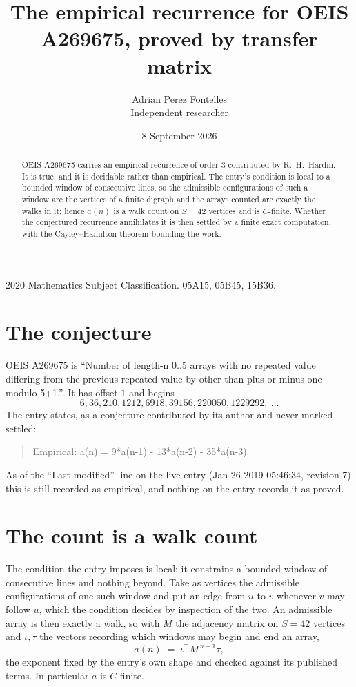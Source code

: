 \documentclass[11pt,a4paper]{article}
\title{The empirical recurrence for OEIS A269675, proved by transfer matrix}
\author{Adrian Perez Fontelles\\ \small Independent researcher}
\date{8 September 2026}
\theoremstyle{plain}
\theoremstyle{definition}
\begin{document}
\maketitle

\begin{abstract}
OEIS A269675 carries an empirical recurrence of order $3$ contributed by R.~H.~Hardin. It is
true, and it is decidable rather than empirical. The entry's condition is local to a bounded window of consecutive lines, so
the admissible configurations of such a window are the vertices of a finite digraph and the
arrays counted are exactly the walks in it; hence $a(n)$ is a walk count on $S=42$ vertices
and is $C$-finite. Whether the conjectured recurrence annihilates it is then settled by a
finite exact computation, with the Cayley--Hamilton theorem bounding the work.
\end{abstract}

\noindent\small 2020 Mathematics Subject Classification. 05A15, 05B45, 15B36.\normalsize

\section{The conjecture}

OEIS A269675 is ``Number of length-n 0..5 arrays with no repeated value differing from the previous repeated value by other than plus or minus one modulo 5+1.''. It has offset $1$ and begins
\[
6, 36, 210, 1212, 6918, 39156, 220050, 1229292,\ \dots
\]
The entry states, as a conjecture contributed by its author and never marked settled:
\begin{quote}
Empirical: a(n) = 9*a(n-1) - 13*a(n-2) - 35*a(n-3).
\end{quote}
As of the ``Last modified'' line on the live entry (Jan 26 2019 05:46:34, revision 7) this is still
recorded as empirical, and nothing on the entry records it as proved.

\section{The count is a walk count}

The condition the entry imposes is local: it constrains a bounded window of consecutive lines and nothing beyond. Take as
vertices the admissible configurations of one such window and put an edge from $u$ to $v$
whenever $v$ may follow $u$, which the condition decides by inspection of the two. An
admissible array is then exactly a walk, so with $M$ the adjacency matrix on $S=42$ vertices
and $\iota,\tau$ the vectors recording which windows may begin and end an array,
\[
a(n)\;=\;\iota^{\!\top}M^{\,n-1}\tau ,
\]
the exponent fixed by the entry's own shape and checked against its published terms. In
particular $a$ is $C$-finite.
\end{document}
